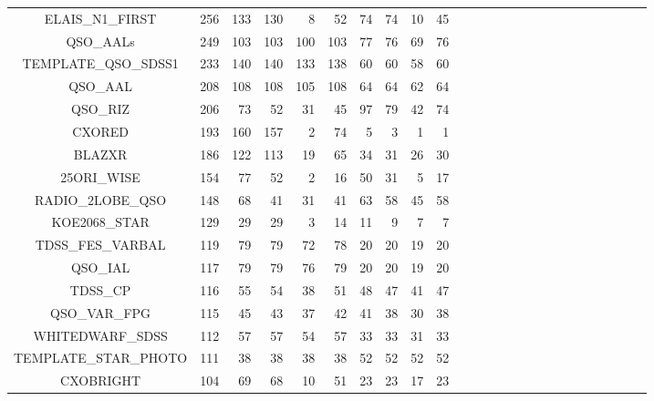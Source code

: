 \documentclass[onecolumn]{aa}
\begin{document}
\begin{center}
\begin{longtable}{c r rrrr rrrr rrrrr rrrrr rrrrr}
ELAIS\_N1\_FIRST 	& 256    & 133 & 130 & 8 & 52 		  & 74 & 74 & 10 & 45 \\ 
QSO\_AALs 		& 249    & 103 & 103 & 100 & 103 	  & 77 & 76 & 69 & 76 \\ 
TEMPLATE\_QSO\_SDSS1 	& 233    & 140 & 140 & 133 & 138 	  & 60 & 60 & 58 & 60 \\ 
QSO\_AAL 		& 208    & 108 & 108 & 105 & 108 	  & 64 & 64 & 62 & 64 \\ 
QSO\_RIZ 		& 206    & 73 & 52 & 31 & 45 		  & 97 & 79 & 42 & 74 \\ 
CXORED 			& 193    & 160 & 157 & 2 & 74 		  & 5 & 3 & 1 & 1 \\ 
BLAZXR 			& 186    & 122 & 113 & 19 & 65 		  & 34 & 31 & 26 & 30 \\ 
25ORI\_WISE 		& 154    & 77 & 52 & 2 & 16 		  & 50 & 31 & 5 & 17 \\ 
RADIO\_2LOBE\_QSO 	& 148    & 68 & 41 & 31 & 41		  & 63 & 58 & 45 & 58 \\ 
KOE2068\_STAR 		& 129    & 29 & 29 & 3 & 14 		  & 11 & 9 & 7 & 7 \\ 
TDSS\_FES\_VARBAL 	& 119    & 79 & 79 & 72 & 78 		  & 20 & 20 & 19 & 20 \\ 
QSO\_IAL 		& 117    & 79 & 79 & 76 & 79 		  & 20 & 20 & 19 & 20 \\ 
TDSS\_CP 		& 116    & 55 & 54 & 38 & 51 		  & 48 & 47 & 41 & 47 \\ 
QSO\_VAR\_FPG 		& 115    & 45 & 43 & 37 & 42 		  & 41 & 38 & 30 & 38 \\ 
WHITEDWARF\_SDSS	& 112    & 57 & 57 & 54 & 57 		  & 33 & 33 & 31 & 33 \\ 
TEMPLATE\_STAR\_PHOTO 	& 111    & 38 & 38 & 38 & 38 		  & 52 & 52 & 52 & 52 \\ 
CXOBRIGHT 		& 104    & 69 & 68 & 10 & 51 		  & 23 & 23 & 17 & 23 \\ 
\hline
\end{longtable}
\end{center}
% 
\end{document}
